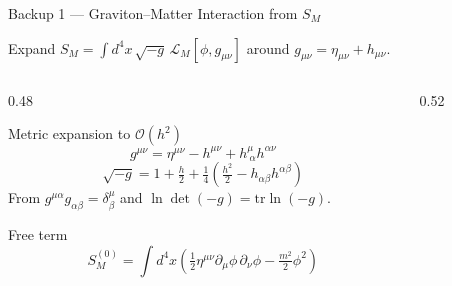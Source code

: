 \documentclass[aspectratio=169]{beamer}
\begin{document}
 
 
\newcommand{\grav}[1]{\textcolor{graviton}{#1}}
\newcommand{\matt}[1]{\textcolor{matter}{#1}}
\newcommand{\half}{\tfrac{1}{2}}
 
\begin{frame}[c]{Backup 1 — Graviton–Matter Interaction from $S_M$}
 
\small
Expand $S_M = \int d^4x\,\sqrt{-g}\,\mathcal{L}_M[\phi,g_{\mu\nu}]$
around $g_{\mu\nu}=\eta_{\mu\nu}+h_{\mu\nu}$.
 
\vspace{0.15cm}
 
\begin{columns}[T, totalwidth=\textwidth]
 
\begin{column}{0.48\textwidth}
 
\begin{block}{Metric expansion to $\mathcal{O}(h^2)$}
\footnotesize
\[
g^{\mu\nu}
= \eta^{\mu\nu}-h^{\mu\nu}+h^\mu_{\ \alpha}h^{\alpha\nu}
\]
\[
\sqrt{-g}
= 1+\tfrac{h}{2}+\tfrac{1}{4}\!\left(\tfrac{h^2}{2}-h_{\alpha\beta}h^{\alpha\beta}\right)
\]
From $g^{\mu\alpha}g_{\alpha\beta}=\delta^\mu_\beta$ and
$\ln\det(-g)=\mathrm{tr}\ln(-g)$.
\end{block}
 
\vspace{0.2cm}
 
\begin{block}{Free term}
\footnotesize
\[
S_M^{(0)}=\int d^4x
\!\left(\half\eta^{\mu\nu}\partial_\mu\phi\,\partial_\nu\phi
-\tfrac{m^2}{2}\phi^2\right)
\]
\end{block}
 
\end{column}
 
\begin{column}{0.52\textwidth}
 

\end{column}
\end{columns}
\end{frame}
\end{document}
